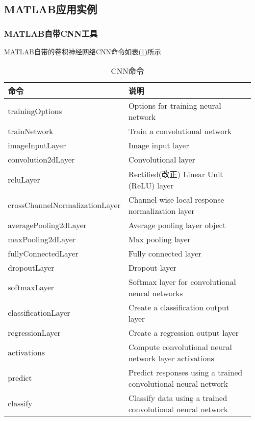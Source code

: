     \subsection{MATLAB应用实例}
        \subsubsection{MATLAB自带CNN工具}
        \par
        MATLAB自带的卷积神经网络CNN命令如表(\ref{tab:CNN命令})所示
        \begin{table}[H]
          \caption{CNN命令}
          \label{tab:CNN命令}
          \centering
          \begin{tabularx}{\textwidth}{l|l}%
          \toprule
          命令  & 说明 \\
          \midrule
          trainingOptions &  Options for training neural network\\
          trainNetwork & Train a convolutional network\\
          imageInputLayer  & Image input layer\\
          convolution2dLayer & Convolutional layer\\
          reluLayer &  Rectified(改正) Linear Unit (ReLU) layer\\
          crossChannelNormalizationLayer&  Channel-wise local response normalization layer\\
          averagePooling2dLayer &  Average pooling layer object\\
          maxPooling2dLayer & Max pooling layer\\
          fullyConnectedLayer  & Fully connected layer\\
          dropoutLayer & Dropout layer\\
          softmaxLayer & Softmax layer for convolutional neural networks\\
          classificationLayer &  Create a classification output layer\\
          regressionLayer &  Create a regression output layer\\
          activations &  Compute convolutional neural network layer activations\\
          predict &  Predict responses using a trained convolutional neural network\\
          classify & Classify data using a trained convolutional neural network\\

\end{tabularx}
\end{table}
